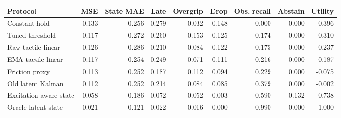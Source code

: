 \begin{tabular}{lrrrrrrrr}
\toprule
Protocol & MSE & State MAE & Late & Overgrip & Drop & Obs. recall & Abstain & Utility \\
\midrule
Constant hold & 0.133 & 0.256 & 0.279 & 0.032 & 0.148 & 0.000 & 0.000 & -0.396 \\
Tuned threshold & 0.117 & 0.272 & 0.260 & 0.153 & 0.125 & 0.174 & 0.000 & -0.310 \\
Raw tactile linear & 0.126 & 0.286 & 0.210 & 0.084 & 0.122 & 0.175 & 0.000 & -0.237 \\
EMA tactile linear & 0.117 & 0.254 & 0.249 & 0.071 & 0.111 & 0.216 & 0.000 & -0.187 \\
Friction proxy & 0.113 & 0.252 & 0.187 & 0.112 & 0.094 & 0.229 & 0.000 & -0.075 \\
Old latent Kalman & 0.112 & 0.252 & 0.214 & 0.084 & 0.085 & 0.379 & 0.000 & -0.002 \\
Excitation-aware state & 0.058 & 0.186 & 0.072 & 0.052 & 0.003 & 0.590 & 0.132 & 0.738 \\
Oracle latent state & 0.021 & 0.121 & 0.022 & 0.016 & 0.000 & 0.990 & 0.000 & 1.000 \\
\bottomrule
\end{tabular}
